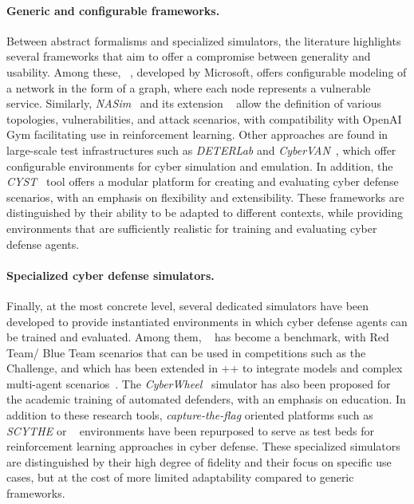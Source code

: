 \paragraph{Generic and configurable frameworks.}
Between abstract formalisms and specialized simulators, the literature highlights several frameworks that aim to offer a compromise between generality and usability. Among these, ~\cite{cyberbattlesim}, developed by Microsoft, offers configurable modeling of a network in the form of a graph, where each node represents a vulnerable service. Similarly, \textit{NASim}~\cite{nasim2023} and its extension ~\cite{fernandes2024nasimemu} allow the definition of various topologies, vulnerabilities, and attack scenarios, with compatibility with OpenAI Gym facilitating use in reinforcement learning. Other approaches are found in large-scale test infrastructures such as \textit{DETERLab} and \textit{CyberVAN}~\cite{Mirkovic2010}, which offer configurable environments for cyber simulation and emulation. In addition, the \textit{CYST}~\cite{Drasar2020} tool offers a modular platform for creating and evaluating cyber defense scenarios, with an emphasis on flexibility and extensibility. These frameworks are distinguished by their ability to be adapted to different contexts, while providing environments that are sufficiently realistic for training and evaluating cyber defense agents.

\paragraph {Specialized cyber defense simulators.}
Finally, at the most concrete level, several dedicated simulators have been developed to provide instantiated environments in which cyber defense agents can be trained and evaluated. Among them, ~\cite{Standen2021} has become a benchmark, with Red Team/ Blue Team scenarios that can be used in competitions such as the  Challenge, and which has been extended in ++ to integrate  models and complex multi-agent scenarios~\cite {landolt2025cyborgpp}. The \textit{CyberWheel}~\cite{vyas2025cyberwheel} simulator has also been proposed for the academic training of automated defenders, with an emphasis on education. In addition to these research tools, \textit{capture-the-flag} oriented platforms such as \textit{SCYTHE} or ~\cite{palmer2023ctf} environments have been repurposed to serve as test beds for reinforcement learning approaches in cyber defense. These specialized simulators are distinguished by their high degree of fidelity and their focus on specific use cases, but at the cost of more limited adaptability compared to generic frameworks.

